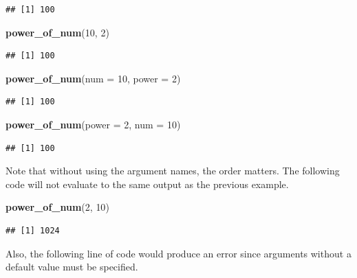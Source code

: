 \documentclass[]{book}
\newenvironment{Shaded}{\begin{snugshade}}{\end{snugshade}}
\newcommand{\KeywordTok}[1]{\textcolor[rgb]{0.13,0.29,0.53}{\textbf{#1}}}
\newcommand{\DataTypeTok}[1]{\textcolor[rgb]{0.13,0.29,0.53}{#1}}
\newcommand{\DecValTok}[1]{\textcolor[rgb]{0.00,0.00,0.81}{#1}}
\newcommand{\NormalTok}[1]{#1}
\theoremstyle{definition}
\theoremstyle{definition}
\theoremstyle{definition}
\theoremstyle{remark}
\begin{document}
\begin{verbatim}
## [1] 100
\end{verbatim}

\begin{Shaded}
\begin{Highlighting}[]
\KeywordTok{power_of_num}\NormalTok{(}\DecValTok{10}\NormalTok{, }\DecValTok{2}\NormalTok{)}
\end{Highlighting}
\end{Shaded}

\begin{verbatim}
## [1] 100
\end{verbatim}

\begin{Shaded}
\begin{Highlighting}[]
\KeywordTok{power_of_num}\NormalTok{(}\DataTypeTok{num =} \DecValTok{10}\NormalTok{, }\DataTypeTok{power =} \DecValTok{2}\NormalTok{)}
\end{Highlighting}
\end{Shaded}

\begin{verbatim}
## [1] 100
\end{verbatim}

\begin{Shaded}
\begin{Highlighting}[]
\KeywordTok{power_of_num}\NormalTok{(}\DataTypeTok{power =} \DecValTok{2}\NormalTok{, }\DataTypeTok{num =} \DecValTok{10}\NormalTok{)}
\end{Highlighting}
\end{Shaded}

\begin{verbatim}
## [1] 100
\end{verbatim}

Note that without using the argument names, the order matters. The
following code will not evaluate to the same output as the previous
example.

\begin{Shaded}
\begin{Highlighting}[]
\KeywordTok{power_of_num}\NormalTok{(}\DecValTok{2}\NormalTok{, }\DecValTok{10}\NormalTok{)}
\end{Highlighting}
\end{Shaded}

\begin{verbatim}
## [1] 1024
\end{verbatim}

Also, the following line of code would produce an error since arguments
without a default value must be specified.
\end{document}
